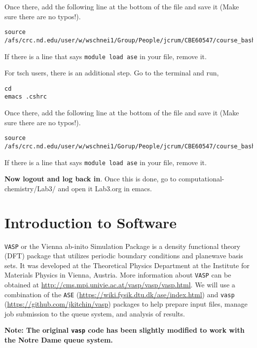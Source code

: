 \documentclass[11pt]{article}
\begin{document}
Once there, add the following line at the bottom of the file and save it (Make sure there are no typos!).

\begin{verbatim}
source /afs/crc.nd.edu/user/w/wschnei1/Group/People/jcrum/CBE60547/course_bashrc.sh
\end{verbatim}

If there is a line that says \texttt{module load ase} in your file, remove it.

For tsch users, there is an additional step. Go to the terminal and run,

\begin{verbatim}
cd
emacs .cshrc
\end{verbatim}

Once there, add the following line at the bottom of the file and save it (Make sure there are no typos!). 

\begin{verbatim}
source /afs/crc.nd.edu/user/w/wschnei1/Gorup/People/jcrum/CBE60547/course_bashrc.sh
\end{verbatim}

If there is a line that says \texttt{module load ase} in your file, remove it.

\textbf{Now logout and log back in}. Once this is done, go to computational-chemistry/Lab3/ and open it Lab3.org in emacs.


\section{Introduction to Software}
\label{sec:org29b8bac}

\texttt{VASP} or the Vienna ab-inito Simulation Package is a density functional theory (DFT) package that utilizes periodic boundary conditions and planewave basis sets. It was developed at the Theoretical Physics Department at the Institute for Materials Physics in Vienna, Austria. More information about \texttt{VASP} can be obtained at \url{http://cms.mpi.univie.ac.at/vasp/vasp/vasp.html}. We will use a combination of the \texttt{ASE} (\url{https://wiki.fysik.dtu.dk/ase/index.html}) and \texttt{vasp} (\url{https://github.com/jkitchin/vasp}) packages to help prepare input files, manage job submission to the queue system, and analysis of results.  

\textbf{Note: The original \texttt{vasp} code has been slightly modified to work with the Notre Dame queue system.}
\end{document}
